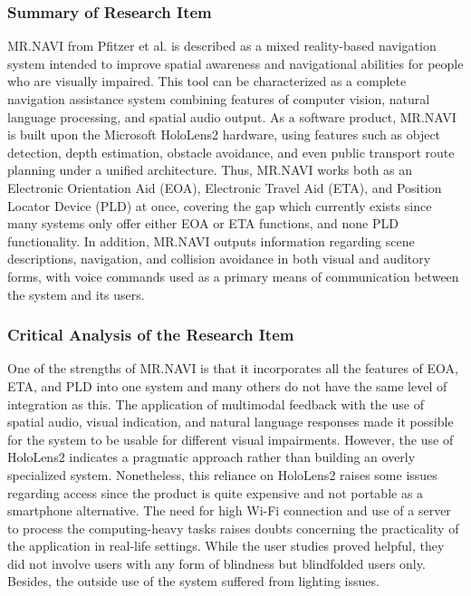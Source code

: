 \documentclass{FastFyp}
\begin{document}
\subsubsection{Summary of Research Item}  
MR.NAVI from Pfitzer et al. \cite{ref:pfitzer2025mr} is described as a mixed reality-based navigation system intended to improve spatial awareness and navigational abilities for people who are visually impaired. This tool can be characterized as a complete navigation assistance system combining features of computer vision, natural language processing, and spatial audio output. As a software product, MR.NAVI is built upon the Microsoft HoloLens2 hardware, using features such as object detection, depth estimation, obstacle avoidance, and even public transport route planning under a unified architecture. Thus, MR.NAVI works both as an Electronic Orientation Aid (EOA), Electronic Travel Aid (ETA), and Position Locator Device (PLD) at once, covering the gap which currently exists since many systems only offer either EOA or ETA functions, and none PLD functionality. In addition, MR.NAVI outputs information regarding scene descriptions, navigation, and collision avoidance in both visual and auditory forms, with voice commands used as a primary means of communication between the system and its users.

\subsubsection{Critical Analysis of the Research Item}  
One of the strengths of MR.NAVI is that it incorporates all the features of EOA, ETA, and PLD into one system and many others do not have the same level of integration as this. The application of multimodal feedback with the use of spatial audio, visual indication, and natural language responses made it possible for the system to be usable for different visual impairments. However, the use of HoloLens2 indicates a pragmatic approach rather than building an overly specialized system. Nonetheless, this reliance on HoloLens2 raises some issues regarding access since the product is quite expensive and not portable as a smartphone alternative. The need for high Wi-Fi connection and use of a server to process the computing-heavy tasks raises doubts concerning the practicality of the application in real-life settings. While the user studies proved helpful, they did not involve users with any form of blindness but blindfolded users only. Besides, the outside use of the system suffered from lighting issues.
\end{document}
